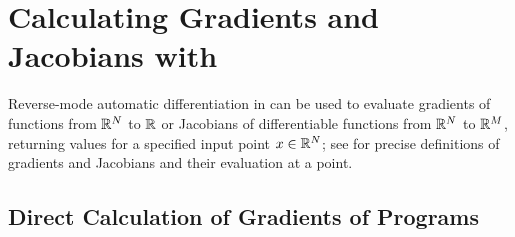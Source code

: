\documentclass[10pt]{article}
\begin{document}
\section{Calculating Gradients and Jacobians with }

Reverse-mode automatic differentiation in  can be
used to evaluate gradients of functions from $\mathbb{R}^N$ to $\mathbb{R}$ or
Jacobians of differentiable functions from $\mathbb{R}^N$ to $\mathbb{R}^M$,
returning values for a specified input point $x \in \mathbb{R}^N$; see
 for precise definitions of
gradients and Jacobians and their evaluation at a point.

\subsection{Direct Calculation of Gradients of Programs}
\end{document}
